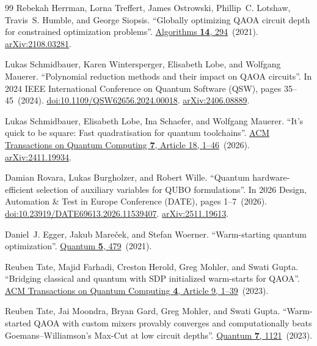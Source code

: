 \documentclass[a4paper,onecolumn,11pt,unpublished]{quantumarticle}
\theoremstyle{remark}
\begin{document}
\begin{thebibliography}{99}
Rebekah Herrman, Lorna Treffert, James Ostrowski, Phillip~C. Lotshaw, Travis~S. Humble, and George Siopsis.
\newblock ``Globally optimizing QAOA circuit depth for constrained optimization problems''.
\newblock \href{https://dx.doi.org/10.3390/a14100294}{Algorithms {\bf 14}, 294}~(2021).
\newblock \href{http://arxiv.org/abs/2108.03281}{arXiv:2108.03281}.

Lukas Schmidbauer, Karen Wintersperger, Elisabeth Lobe, and Wolfgang Mauerer.
\newblock ``Polynomial reduction methods and their impact on QAOA circuits''.
\newblock In 2024 IEEE International Conference on Quantum Software (QSW), pages 35--45~(2024).
\newblock \href{https://dx.doi.org/10.1109/QSW62656.2024.00018}{doi:10.1109/QSW62656.2024.00018}.
\newblock \href{http://arxiv.org/abs/2406.08889}{arXiv:2406.08889}.

Lukas Schmidbauer, Elisabeth Lobe, Ina Schaefer, and Wolfgang Mauerer.
\newblock ``It's quick to be square: Fast quadratisation for quantum toolchains''.
\newblock \href{https://dx.doi.org/10.1145/3800943}{ACM Transactions on Quantum Computing {\bf 7}, Article 18, 1--46}~(2026).
\newblock \href{http://arxiv.org/abs/2411.19934}{arXiv:2411.19934}.

Damian Rovara, Lukas Burgholzer, and Robert Wille.
\newblock ``Quantum hardware-efficient selection of auxiliary variables for QUBO formulations''.
\newblock In 2026 Design, Automation \& Test in Europe Conference (DATE), pages 1--7~(2026).
\newblock \href{https://dx.doi.org/10.23919/DATE69613.2026.11539407}{doi:10.23919/DATE69613.2026.11539407}.
\newblock \href{http://arxiv.org/abs/2511.19613}{arXiv:2511.19613}.

Daniel~J. Egger, Jakub Mare{\v c}ek, and Stefan Woerner.
\newblock ``Warm-starting quantum optimization''.
\newblock \href{https://dx.doi.org/10.22331/q-2021-06-17-479}{Quantum {\bf 5}, 479}~(2021).

Reuben Tate, Majid Farhadi, Creston Herold, Greg Mohler, and Swati Gupta.
\newblock ``Bridging classical and quantum with SDP initialized warm-starts for QAOA''.
\newblock \href{https://dx.doi.org/10.1145/3549554}{ACM Transactions on Quantum Computing {\bf 4}, Article 9, 1--39}~(2023).

Reuben Tate, Jai Moondra, Bryan Gard, Greg Mohler, and Swati Gupta.
\newblock ``Warm-started QAOA with custom mixers provably converges and computationally beats Goemans--Williamson's Max-Cut at low circuit depths''.
\newblock \href{https://dx.doi.org/10.22331/q-2023-09-26-1121}{Quantum {\bf 7}, 1121}~(2023).


\end{thebibliography}
\end{document}
